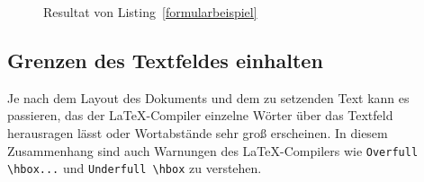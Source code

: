 \documentclass[a4paper,10pt,twoside]{scrbook}
\begin{document}
\begin{figure}[H]
	\caption{Resultat von Listing~\ref{formularbeispiel}}
	\label{fig_formularbeispiel}
\end{figure}



\subsection{Grenzen des Textfeldes einhalten}

Je nach dem Layout des Dokuments und dem zu setzenden Text kann es passieren, das der \LaTeX-Compiler einzelne Wörter über das Textfeld herausragen lässt oder Wortabstände sehr groß erscheinen. In diesem Zusammenhang sind auch Warnungen des \LaTeX-Compilers wie \verb!Overfull \hbox...! und \verb!Underfull \hbox! zu verstehen.
\end{document}
